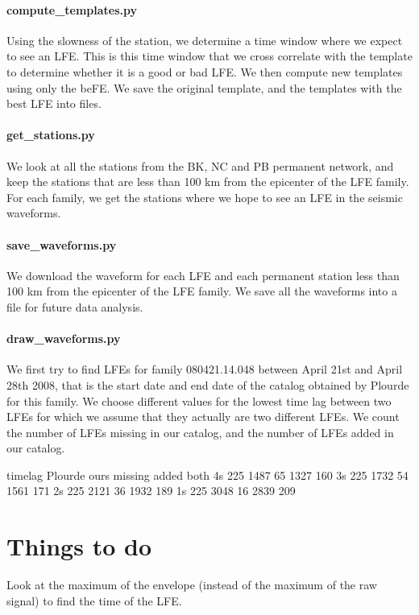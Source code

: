 \documentclass[workdone.tex]{subfiles}
\begin{document}
\paragraph{compute\_templates.py} Using the slowness of the station, we determine a time window where we expect to see an LFE. This is this time window that we cross correlate with the template to determine whether it is a good or bad LFE. We then compute new templates using only the beFE. We save the original template, and the templates with the best LFE into files.

\paragraph{get\_stations.py} We look at all the stations from the BK, NC and PB permanent network, and keep the stations that are less than 100 km from the epicenter of the LFE family. For each family, we get the stations where we hope to see an LFE in the seismic waveforms.

\paragraph{save\_waveforms.py} We download the waveform for each LFE and each permanent station less than 100 km from the epicenter of the LFE family. We save all the waveforms into a file for future data analysis.

\paragraph{draw\_waveforms.py}

We first try to find LFEs for family 080421.14.048 between April 21st and April 28th 2008, that is the start date and end date of the catalog obtained by Plourde for this family. We choose different values for the lowest time lag between two LFEs for which we assume that they actually are two different LFEs. We count the number of LFEs missing in our catalog, and the number of LFEs added in our catalog.

timelag Plourde ours missing added both
4s 225 1487 65 1327 160
3s 225 1732 54 1561 171
2s 225 2121 36 1932 189
1s 225 3048 16 2839 209

\section{Things to do}

Look at the maximum of the envelope (instead of the maximum of the raw signal) to find the time of the LFE.
\end{document}

